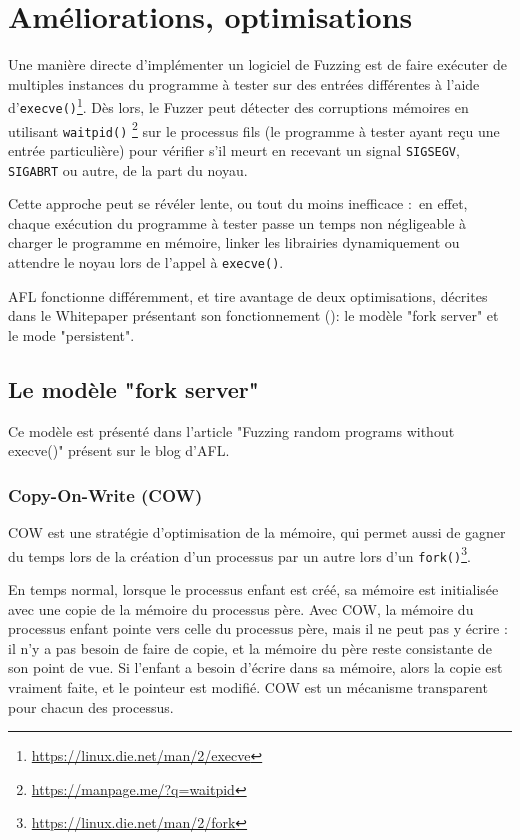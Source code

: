 \section{Améliorations, optimisations}

Une manière directe d'implémenter un logiciel de Fuzzing est de faire exécuter de multiples instances du programme à tester sur des entrées différentes à l'aide d'\lstinline{execve()}\footnote{\url{https://linux.die.net/man/2/execve}}.
Dès lors, le Fuzzer peut détecter des corruptions mémoires en utilisant \lstinline{waitpid()} \footnote{\url{https://manpage.me/?q=waitpid}} sur le processus fils (le programme à tester ayant reçu une entrée particulière) pour vérifier s'il meurt en recevant un signal \lstinline{SIGSEGV}, \lstinline{SIGABRT} ou autre, de la part du noyau.

Cette approche peut se révéler lente, ou tout du moins inefficace : en effet, chaque exécution du programme à tester passe un temps non négligeable à charger le programme en mémoire, linker les librairies dynamiquement ou attendre le noyau lors de l'appel à \lstinline{execve()}.

AFL fonctionne différemment, et tire avantage de deux optimisations, décrites dans le Whitepaper présentant son fonctionnement (\cite[section 10 : The fork server]{technical-details}): le modèle "fork server" et le mode "persistent".


\subsection{Le modèle "fork server"}\label{fork-server}

Ce modèle est présenté dans l'article "Fuzzing random programs without execve()"\cite{fuzzing-binaries-without-execve} présent sur le blog d'AFL.

\subsubsection{Copy-On-Write (COW)}

COW est une stratégie d'optimisation de la mémoire, qui permet aussi de gagner du temps lors de la création d'un processus par un autre lors d'un \lstinline{fork()}\footnote{\url{https://linux.die.net/man/2/fork}}.

En temps normal, lorsque le processus enfant est créé, sa mémoire est initialisée avec une copie de la mémoire du processus père.
Avec COW, la mémoire du processus enfant pointe vers celle du processus père, mais il ne peut pas y écrire : il n'y a pas besoin de faire de copie, et la mémoire du père reste consistante de son point de vue.
Si l'enfant a besoin d'écrire dans sa mémoire, alors la copie est vraiment faite, et le pointeur est modifié.
COW est un mécanisme transparent pour chacun des processus.

